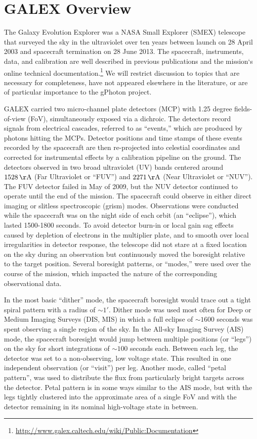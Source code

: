 \documentclass[preprint]{aastex}
\begin{document}
\section{GALEX Overview}
The Galaxy Evolution Explorer \citep{mar2005} was a NASA Small Explorer (SMEX) telescope that surveyed the sky in the ultraviolet over ten years between launch on 28 April 2003 and spacecraft termination on 28 June 2013. The spacecraft, instruments, data, and calibration are well described in previous publications \citep{mor2005,mor2007} and the mission`s online technical documentation.\footnote{\url{http://www.galex.caltech.edu/wiki/Public:Documentation}} We will restrict discussion to topics that are necessary for completeness, have not appeared elsewhere in the literature, or are of particular importance to the gPhoton project.

GALEX carried two micro-channel plate detectors (MCP) with 1.25 degree fields-of-view (FoV), simultaneously exposed via a dichroic. The detectors record signals from electrical cascades, referred to as ``events,'' which are produced by photons hitting the MCPs. Detector positions and time stamps of these events recorded by the spacecraft are then re-projected into celestial coordinates and corrected for instrumental effects by a calibration pipeline on the ground. The detectors observed in two broad ultraviolet (UV) bands centered around $1528\,\rm{\AA}$ (Far Ultraviolet or ``FUV'') and $2271\,\rm{\AA}$ (Near Ultraviolet or ``NUV''). The FUV detector failed in May of 2009, but the NUV detector continued to operate until the end of the mission. The spacecraft could observe in either direct imaging or slitless spectroscopic (grism) modes. Observations were conducted while the spacecraft was on the night side of each orbit (an ``eclipse''), which lasted 1500-1800 seconds. To avoid detector burn-in or local gain sag effects caused by depletion of electrons in the multiplier plate, and to smooth over local irregularities in detector response, the telescope did not stare at a fixed location on the sky during an observation but continuously moved the boresight relative to the target position. Several boresight patterns, or ``modes,'' were used over the course of the mission, which impacted the nature of the corresponding observational data.

In the most basic ``dither'' mode, the spacecraft boresight would trace out a tight spiral pattern with a radius of $\sim1'$. Dither mode was used most often for Deep or Medium Imaging Surveys (DIS, MIS) in which a full eclipse of $\sim1600$ seconds was spent observing a single region of the sky. In the All-sky Imaging Survey (AIS) mode, the spacecraft boresight would jump between multiple positions (or ``legs'') on the sky for short integrations of $\sim100$ seconds each. Between each leg, the detector was set to a non-observing, low voltage state. This resulted in one independent observation (or ``visit'') per leg. Another mode, called ``petal pattern'', was used to distribute the flux from particularly bright targets across the detector. Petal pattern is in some ways similar to the AIS mode, but with the legs tightly clustered into the approximate area of a single FoV and with the detector remaining in its nominal high-voltage state in between.
\end{document}
